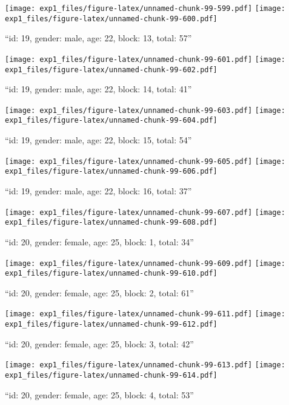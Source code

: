\documentclass[,]{article}
\begin{document}
\texttt{[image: exp1\_files/figure-latex/unnamed-chunk-99-599.pdf]}
\texttt{[image: exp1\_files/figure-latex/unnamed-chunk-99-600.pdf]}

\newpage
[1] 

``id: 19, gender: male, age: 22, block: 13, total: 57''

\texttt{[image: exp1\_files/figure-latex/unnamed-chunk-99-601.pdf]}
\texttt{[image: exp1\_files/figure-latex/unnamed-chunk-99-602.pdf]}

\newpage
[1] 

``id: 19, gender: male, age: 22, block: 14, total: 41''

\texttt{[image: exp1\_files/figure-latex/unnamed-chunk-99-603.pdf]}
\texttt{[image: exp1\_files/figure-latex/unnamed-chunk-99-604.pdf]}

\newpage
[1] 

``id: 19, gender: male, age: 22, block: 15, total: 54''

\texttt{[image: exp1\_files/figure-latex/unnamed-chunk-99-605.pdf]}
\texttt{[image: exp1\_files/figure-latex/unnamed-chunk-99-606.pdf]}

\newpage
[1] 

``id: 19, gender: male, age: 22, block: 16, total: 37''

\texttt{[image: exp1\_files/figure-latex/unnamed-chunk-99-607.pdf]}
\texttt{[image: exp1\_files/figure-latex/unnamed-chunk-99-608.pdf]}

\newpage
[1] 

``id: 20, gender: female, age: 25, block: 1, total: 34''

\texttt{[image: exp1\_files/figure-latex/unnamed-chunk-99-609.pdf]}
\texttt{[image: exp1\_files/figure-latex/unnamed-chunk-99-610.pdf]}

\newpage
[1] 

``id: 20, gender: female, age: 25, block: 2, total: 61''

\texttt{[image: exp1\_files/figure-latex/unnamed-chunk-99-611.pdf]}
\texttt{[image: exp1\_files/figure-latex/unnamed-chunk-99-612.pdf]}

\newpage
[1] 

``id: 20, gender: female, age: 25, block: 3, total: 42''

\texttt{[image: exp1\_files/figure-latex/unnamed-chunk-99-613.pdf]}
\texttt{[image: exp1\_files/figure-latex/unnamed-chunk-99-614.pdf]}

\newpage
[1] 

``id: 20, gender: female, age: 25, block: 4, total: 53''
\end{document}
